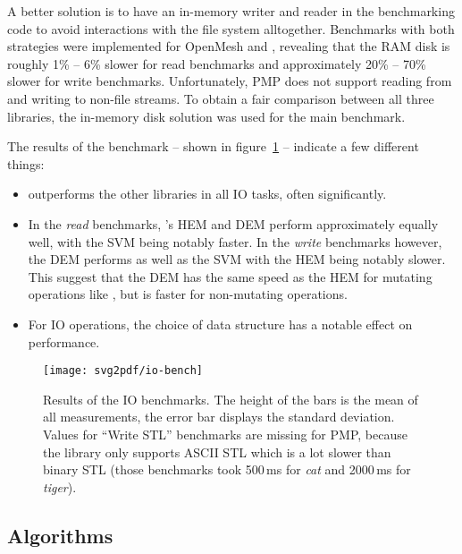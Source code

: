 A better solution is to have an in-memory writer and reader in the benchmarking code to avoid interactions with the file system alltogether.
Benchmarks with both strategies were implemented for OpenMesh and , revealing that the RAM disk is roughly 1\% -- 6\% slower for read benchmarks and approximately 20\% -- 70\% slower for write benchmarks.
Unfortunately, PMP does not support reading from and writing to non-file streams.
To obtain a fair comparison between all three libraries, the in-memory disk solution was used for the main benchmark.

The results of the benchmark -- shown in figure~\ref{fig:io-benchmark} -- indicate a few different things:

\begin{itemize}
  \item {} outperforms the other libraries in all IO tasks, often significantly.
  \item In the \emph{read} benchmarks, 's HEM and DEM perform approximately equally well, with the SVM being notably faster.
  In the \emph{write} benchmarks however, the DEM performs as well as the SVM with the HEM being notably slower.
  This suggest that the DEM has the same speed as the HEM for mutating operations like , but is faster for non-mutating operations.
  \item For IO operations, the choice of data structure has a notable effect on performance.
\end{itemize}

\begin{figure}[p]
  \centering
  \centerline{
    \texttt{[image: svg2pdf/io-bench]}
  }
  \vspace{1cm}
  \caption{
    Results of the IO benchmarks.
    The height of the bars is the mean of all measurements, the error bar displays the standard deviation.
    Values for \enquote{Write STL} benchmarks are missing for PMP, because the library only supports ASCII STL which is a lot slower than binary STL (those benchmarks took 500\,ms for \emph{cat} and 2000\,ms for \emph{tiger}).
  }
  \label{fig:io-benchmark}
\end{figure}

\newpage

\subsection{Algorithms}

\lipsum[1]


